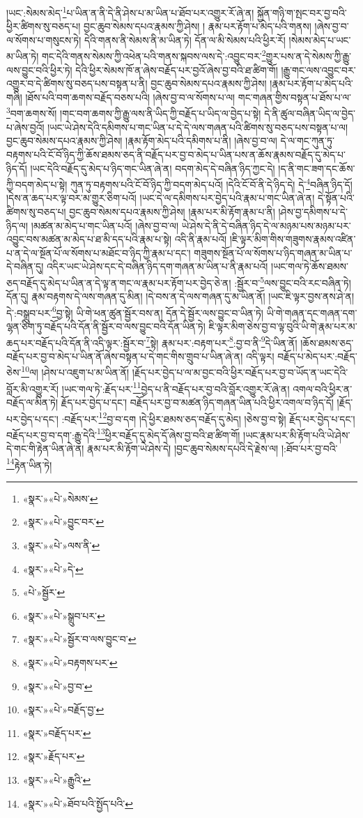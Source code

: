 །ཡང་:སེམས་མེད་\footnote{«སྣར་»«པེ་»སེམས་}པ་ཡིན་ན་ནི་དེ་ནི་ཤེས་པ་མ་ཡིན་པ་ཐོབ་པར་འགྱུར་རོ་ཞེ་ན། སྐྱོན་གཉི་ག་སྤང་བར་བྱ་བའི་ཕྱིར་ཚིགས་སུ་བཅད་པ། བྱང་ཆུབ་སེམས་དཔའ་རྣམས་ཀྱི་ཤེས། །
རྣམ་པར་རྟོག་པ་མེད་པའི་གནས། །ཞེས་བྱ་བ་ལ་སོགས་པ་གསུངས་ཏེ། དེའི་གནས་ནི་སེམས་ནི་མ་ཡིན་ཏེ། དོན་ལ་མི་སེམས་པའི་ཕྱིར་རོ། །སེམས་མེད་པ་ཡང་མ་ཡིན་ཏེ། གང་དེའི་གནས་སེམས་ཀྱི་འཕེན་པའི་གནས་སྐབས་ལས་དེ་:འབྱུང་བར་\footnote{«སྣར་»«པེ་»བྱུང་བར་}གྱུར་པས་ན་དེ་སེམས་ཀྱི་རྒྱུ་ལས་བྱུང་བའི་ཕྱིར་ཏེ། དེའི་ཕྱིར་སེམས་ཁོ་ན་ཞེས་བརྗོད་པར་བྱའོ་ཞེས་བྱ་བའི་ཐ་ཚིག་གོ། །རྒྱུ་གང་ལས་འབྱུང་བར་འགྱུར་བ་དེ་ཚིགས་སུ་བཅད་པས་བསྟན་པ་ནི། བྱང་ཆུབ་སེམས་དཔའ་རྣམས་ཀྱི་ཤེས། །རྣམ་པར་རྟོག་པ་མེད་པའི་གཞི། །ཐོས་པའི་བག་ཆགས་བརྗོད་བཅས་པའི། །ཞེས་བྱ་བ་ལ་སོགས་པ་ལ། གང་གཞན་གྱིས་བསྟན་པ་ཐོས་པ་ལ་\footnote{«སྣར་»«པེ་»ལས་ནི་}བག་ཆགས་སོ། །གང་བག་ཆགས་ཀྱི་རྒྱུ་ལས་ནི་ཡིད་ཀྱི་བརྗོད་པ་ཡིད་ལ་བྱེད་པ་སྟེ། དེ་ནི་ཚུལ་བཞིན་ཡིད་ལ་བྱེད་པ་ཞེས་བྱའོ། །ཡང་ཡེ་ཤེས་དེའི་དམིགས་པ་གང་ཡིན་པ་དེ་དེ་ལས་གཞན་པའི་ཚིགས་སུ་བཅད་པས་བསྟན་པ་ལ། བྱང་ཆུབ་སེམས་དཔའ་རྣམས་ཀྱི་ཤེས། །རྣམ་རྟོག་མེད་པའི་དམིགས་པ་ནི། །ཞེས་བྱ་བ་ལ། དེ་ལ་གང་ཀུན་ཏུ་བརྟགས་པའི་ངོ་བོ་ཉིད་ཀྱི་ཆོས་ཐམས་ཅད་ནི་བརྗོད་པར་བྱ་བ་མེད་པ་ཡིན་པས་ན་ཆོས་རྣམས་བརྗོད་དུ་མེད་པ་ཉིད་དོ། །ཡང་དེའི་བརྗོད་དུ་མེད་པ་ཉིད་གང་ཡིན་ཞེ་ན། བདག་མེད་དེ་བཞིན་ཉིད་ཀྱང་དེ། །ད་ནི་གང་ཟག་དང་ཆོས་ཀྱི་བདག་མེད་པ་སྟེ། ཀུན་ཏུ་བརྟགས་པའི་ངོ་བོ་ཉིད་ཀྱི་བདག་མེད་པའོ། །དེའི་ངོ་བོ་ནི་དེ་ཉིད་དེ། དེ་\footnote{«སྣར་»«པེ་»དེ་}བཞིན་ཉིད་དོ། །དེས་ན་ཆད་པར་ལྟ་བར་མ་གྱུར་ཅིག་པའོ། །ཡང་དེ་ལ་དམིགས་པར་བྱེད་པའི་རྣམ་པ་གང་ཡིན་ཞེ་ན། དེ་སྟོན་པའི་ཚིགས་སུ་བཅད་པ། བྱང་ཆུབ་སེམས་དཔའ་རྣམས་ཀྱི་ཤེས། །རྣམ་པར་མི་རྟོག་རྣམ་པ་ནི། །ཤེས་བྱ་དམིགས་པ་དེ་ཉིད་ལ། །མཚན་མ་མེད་པ་གང་ཡིན་པའོ། །ཞེས་བྱ་བ་ལ། ཡེ་ཤེས་དེ་ནི་དེ་བཞིན་ཉིད་དེ་ལ་མཉམ་པས་མཉམ་པར་འབྱུང་བས་མཚན་མ་མེད་པ་ཐ་མི་དད་པའི་རྣམ་པ་སྟེ། འདི་ནི་རྣམ་པའོ། །ཇི་ལྟར་མིག་གིས་གཟུགས་རྣམས་འཛིན་པ་ན་དེ་ལ་སྔོན་པོ་ལ་སོགས་པ་མཐོང་བ་ཉིད་ཀྱི་རྣམ་པ་དང་། གཟུགས་སྔོན་པོ་ལ་སོགས་པ་ཉིད་གཞན་མ་ཡིན་པ་དེ་བཞིན་དུ། འདིར་ཡང་ཡེ་ཤེས་དང་དེ་བཞིན་ཉིད་དག་གཞན་མ་ཡིན་པ་ནི་རྣམ་པའོ། །ཡང་གལ་ཏེ་ཆོས་ཐམས་ཅད་བརྗོད་དུ་མེད་པ་ཡིན་ན་དེ་ལྟ་ན་གང་ལ་རྣམ་པར་རྟོག་པར་བྱེད་ཅེ་ན། :སྦྱོར་བ་\footnote{«པེ་»སྦྱོར་}ལས་བྱུང་བའི་རང་བཞིན་ཏེ། དོན་དུ། རྣམ་བརྟགས་དེ་ལས་གཞན་དུ་མིན། །དེ་བས་ན་དེ་ལས་གཞན་དུ་མ་ཡིན་ནོ། །ཡང་ཇི་ལྟར་བྱས་ནས་ཤེ་ན། དེ་:བསྒྲུབ་པར་\footnote{«སྣར་»«པེ་»སྒྲུབ་པར་}བྱ་སྟེ། ཡི་གེ་ཕན་ཚུན་སྦྱོར་བས་ན། དོན་དེ་སྦྱོར་ལས་བྱུང་བ་ཡིན་ཏེ། ཡི་གེ་གཞན་དང་གཞན་དག་ལྷན་ཅིག་ཏུ་བརྗོད་པའི་དོན་ནི་སྦྱོར་བ་ལས་བྱུང་བའི་དོན་ཡིན་ཏེ། ཇི་ལྟར་མིག་ཅེས་བྱ་བ་ལྟ་བུའི་ཡི་གེ་རྣམ་པར་མ་ཆད་པར་བརྗོད་པའི་དོན་ནི་འདི་ལྟར་:སྦྱོར་བ་\footnote{«སྣར་»«པེ་»སྦྱོར་བ་ལས་བྱུང་བ་}སྟེ། རྣམ་པར་:བརྟག་པར་\footnote{«སྣར་»«པེ་»བརྟགས་པར་}:བྱ་བ་ནི་\footnote{«སྣར་»«པེ་»བྱ་བ་}དེ་ཡིན་ནོ། །ཆོས་ཐམས་ཅད་བརྗོད་པར་བྱ་བ་མེད་པ་ཡིན་ནོ་ཞེས་བསྟན་པ་དེ་གང་གིས་གྲུབ་པ་ཡིན་ཞེ་ན། འདི་ལྟར། བརྗོད་པ་མེད་པར་:བརྗོད་ཅེས་\footnote{«སྣར་»«པེ་»བརྗོད་བྱ་}ལ། །ཤེས་པ་འཇུག་པ་མ་ཡིན་ནོ། །རྗོད་པར་བྱེད་པ་ལ་མ་བྱང་བའི་ཕྱིར་བརྗོད་པར་བྱ་བ་ཡོད་ན་ཡང་དེའི་བློར་མི་འགྱུར་རོ། །ཡང་གལ་ཏེ་:རྗོད་པར་\footnote{«སྣར་»བརྗོད་པར་}བྱེད་པ་ནི་བརྗོད་པར་བྱ་བའི་བློར་འགྱུར་རོ་ཞེ་ན། འགལ་བའི་ཕྱིར་ན་བརྗོད་ལ་མིན་ཏེ། རྗོད་པར་བྱེད་པ་དང་། བརྗོད་པར་བྱ་བ་མཚན་ཉིད་གཞན་ཡིན་པའི་ཕྱིར་འགལ་བ་ཉིད་དོ། །རྗོད་པར་བྱེད་པ་དང་། :བརྗོད་པར་\footnote{«སྣར་»རྗོད་པར་}བྱ་བ་དག །དེ་ཕྱིར་ཐམས་ཅད་བརྗོད་དུ་མེད། །ཅེས་བྱ་བ་སྟེ། རྗོད་པར་བྱེད་པ་དང་། བརྗོད་པར་བྱ་བ་དག་:རྒྱུ་དེའི་\footnote{«སྣར་»«པེ་»རྒྱུའི་}ཕྱིར་བརྗོད་དུ་མེད་དོ་ཞེས་བྱ་བའི་ཐ་ཚིག་གོ། །ཡང་རྣམ་པར་མི་རྟོག་པའི་ཡེ་ཤེས་དེ་གང་གི་རྟེན་ཡིན་ཞེ་ན། རྣམ་པར་མི་རྟོག་ཡེ་ཤེས་དེ། །བྱང་ཆུབ་སེམས་དཔའི་དེ་རྗེས་ལ། །:ཐོབ་པར་བྱ་བའི་\footnote{«སྣར་»«པེ་»ཐོབ་པའི་སྤྱོད་པའི་}རྟེན་ཡིན་ཏེ། 